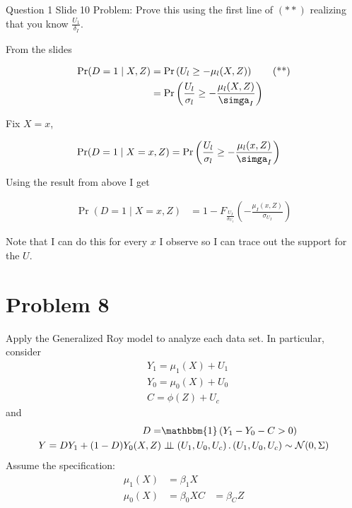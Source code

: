 \documentclass{article}
\begin{document}
\begin{problem}{Question 1 Slide 10}
Problem: Prove this using the first line of $(* *)$ realizing that you know $\frac{U_{1}}{\delta_{I}}$.
\end{problem}
\begin{solution}
From the slides

\begin{align*} \operatorname{Pr}(D=1 \mid X, Z) &=\operatorname{Pr}\left(U_{l} \geq-\mu_{l}(X, Z)\right)\tag{**} \\ 
&=\operatorname{Pr}\left(\frac{U_l}{\sigma_l}\geq-\frac{\mu_{l}(X, Z)}{\simga_I}\right)
\end{align*}

Fix $X=x$,

\begin{align*} 
    \operatorname{Pr}(D=1 \mid X=x, Z) 
    &=\operatorname{Pr}\left(\frac{U_l}{\sigma_l}\geq-\frac{\mu_{l}(x, Z)}{\simga_I}\right) 
\end{align*}

Using the result from above I get

\begin{align*} 
    \operatorname{Pr}(D=1 \mid X=x, Z) 
    &= 1-F_{\frac{U_{I}}{\sigma_{U_{I}}}}\left(-\frac{\mu_{I}(x, Z)}{\sigma_{U_{I}}}\right)
\end{align*}

Note that I can do this for every $x$ I observe so I can trace out the support for the $U$.
\end{solution}


\newpage

\section*{Problem 8}
 
 
Apply the Generalized Roy model to analyze each data set. In particular, consider
\begin{align*}
    &Y_{1}=\mu_{1}(X)+U_{1} \\
    &Y_{0}=\mu_{0}(X)+U_{0} \\
    &C=\phi(Z)+U_{c}
\end{align*}
and
\begin{align*}
    D=&\mathbbm{1}\left(Y_{1}-Y_{0}-C>0\right) \\
    Y=D Y_{1}+(1-D) Y_{0}(X, Z) &\indp\left(U_{1}, U_{0}, U_{c}\right) .\left(U_{1}, U_{0}, U_{c}\right) \sim \mathcal{N}(0, \Sigma)
\end{align*}
Assume the specification:
\begin{align*}
    \mu_{1}(X) &=\beta_{1} X \\
    \mu_{0}(X) &=\beta_{0} X
    C &=\beta_{C} Z
\end{align*}
 
\end{document}
